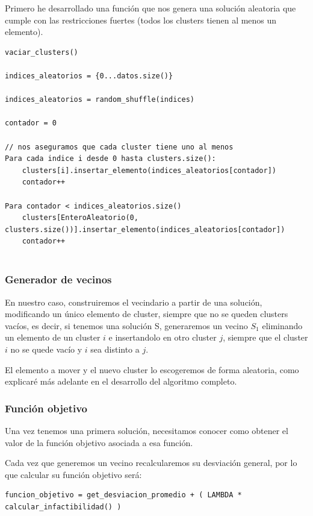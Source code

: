 \documentclass[12pt, spanish]{article}
\begin{document}
 Primero he desarrollado una función que nos genera una solución aleatoria que cumple con las restricciones fuertes (todos los clusters tienen al menos un elemento).
 
 \begin{lstlisting}
vaciar_clusters()

indices_aleatorios = {0...datos.size()}

indices_aleatorios = random_shuffle(indices)

contador = 0

// nos aseguramos que cada cluster tiene uno al menos
Para cada indice i desde 0 hasta clusters.size():
	clusters[i].insertar_elemento(indices_aleatorios[contador])
	contador++
	
Para contador < indices_aleatorios.size()
	clusters[EnteroAleatorio(0, clusters.size())].insertar_elemento(indices_aleatorios[contador])
	contador++
	

\end{lstlisting}
 
 
\subsubsection{Generador de vecinos}

En nuestro caso, construiremos el vecindario a partir de una solución, modificando un único elemento de cluster, siempre que no se queden clusters vacíos, es decir, si tenemos una solución S, generaremos un vecino $S_1$ eliminando un elemento de un cluster $i$ e insertandolo en otro cluster $j$, siempre que el cluster $i$ no se quede vacío y $i$ sea distinto a $j$.

El elemento a mover y el nuevo cluster lo escogeremos de forma aleatoria, como explicaré más adelante en el desarrollo del algoritmo completo.

 
\subsubsection{Función objetivo} 
 
Una vez tenemos una primera solución, necesitamos conocer como obtener el valor de la función objetivo asociada a esa función.

Cada vez que generemos un vecino recalcularemos su desviación general, por lo que calcular su función objetivo será:

\begin{lstlisting}
funcion_objetivo = get_desviacion_promedio + ( LAMBDA * calcular_infactibilidad() )
 \end{lstlisting}
\end{document}
